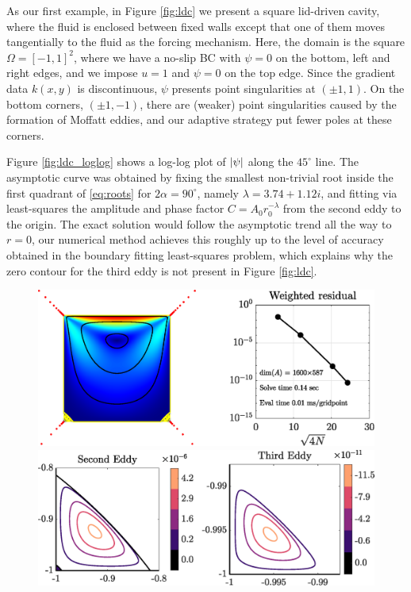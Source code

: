 \begin{example}
\label{ex:square}
As our first example, in Figure \ref{fig:ldc} we present a square lid-driven cavity, where the fluid is enclosed between fixed walls except that one of them moves tangentially to the fluid as the forcing mechanism. Here, the domain is the square $\Omega=[-1,1]^2$, where we have a no-slip BC with $\psi=0$ on the bottom, left and right edges, and we impose $u=1$ and $\psi=0$ on the top edge. Since the gradient data $k(x,y)$ is discontinuous, $\psi$ presents point singularities at $(\pm 1, 1)$. On the bottom corners, $(\pm 1,-1)$, there are (weaker) point singularities caused by the formation of Moffatt eddies, and our adaptive strategy put fewer poles at these corners.

Figure \ref{fig:ldc_loglog} shows a log-log plot of $\abs{\psi}$ along the $45^\circ$ line. The asymptotic curve was obtained by fixing the smallest non-trivial root inside the first quadrant of \eqref{eq:roots} for $2\alpha=90^\circ$, namely $\lambda=3.74 + 1.12i$, and fitting via least-squares the amplitude and phase factor $C = A_0 r_0^{-\lambda}$ from the second eddy to the origin.  The exact solution would follow the asymptotic trend all the way to $r=0$, our numerical method achieves this roughly up to the level of accuracy obtained in the boundary fitting least-squares problem, which explains why the zero contour for the third eddy is not present in Figure \ref{fig:ldc}. 
\begin{figure}[H]
\centering
\includegraphics[width=\linewidth]{Figures/ldc}

\vspace{2em}
\includegraphics[width=\linewidth]{Figures/ldc_eddy}


\end{figure}
\end{example}

